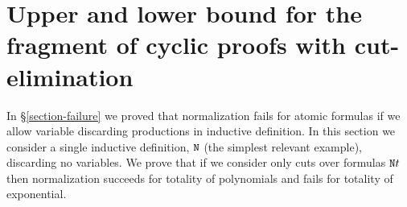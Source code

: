 \documentclass[a4paper,12pt]{article}
\newcommand{\Nat}               { {\tt N}  }
\newcommand{\Tot}           { {\tt T} }
\newcommand{\Ack}   {{\tt A}}
\newcommand{\CLKID} { {\tt CLKID} }
\begin{document}
%





\section{Upper and lower bound for the fragment of cyclic proofs with cut-elimination}
In \S \ref{section-failure} we proved that normalization fails for atomic formulas if we allow variable discarding productions in inductive definition. In this section we consider a single inductive definition, 
$\Nat$ (the simplest relevant example), discarding no variables. We prove that if we consider only cuts over formulas $\Nat t$  then normalization succeeds for totality of polynomials and fails for totality of exponential.
\end{document}
